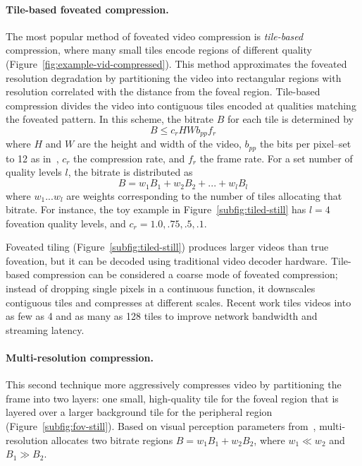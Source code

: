 \paragraph{Tile-based foveated compression.}
The most popular method of foveated video compression is \emph{tile-based} compression, where many small tiles encode regions of different quality (Figure~\ref{fig:example-vid-compressed}).
This method approximates the foveated resolution degradation by partitioning the video into rectangular regions with resolution correlated with the distance from the foveal region.
Tile-based compression divides the video into contiguous tiles encoded at qualities matching the foveated pattern.
In this scheme, the bitrate $B$ for each tile is determined by
\begin{equation}
    B \leq c_{r}HWb_{pp}f_{r}
\end{equation}
where $H$ and $W$ are the height and width of the video, $b_{pp}$ the bits per pixel--set to 12 as in~\cite{kaplanyan2019deepfovea}, $c_r$ the compression rate, and $f_r$ the frame rate.
For a set number of quality levels $l$, the bitrate is distributed as
\begin{equation}B = w_{1}B_{1} + w_{2}B_{2} + ... + w_{l}B_{l}
\end{equation}
where $w_{1} ... w_{l}$ are weights corresponding to the number of tiles allocating that bitrate.
For instance, the toy example in Figure~\ref{subfig:tiled-still} has $l=4$ foveation quality levels, and $c_r = {1.0, .75, .5, .1}$.

Foveated tiling (Figure~\ref{subfig:tiled-still}) produces larger videos than true foveation, but it can be decoded using traditional video decoder hardware.
Tile-based compression can be considered a coarse mode of foveated compression; instead of dropping single pixels in a continuous function, it downscales contiguous tiles and compresses at different scales.
Recent work tiles videos into as few as 4 and as many as 128 tiles to improve network bandwidth and streaming latency.

\paragraph{Multi-resolution compression.} This second technique more aggressively compresses video by partitioning the frame into two layers: one small, high-quality tile for the foveal region that is layered over a larger background tile for the peripheral region~\cite{guenter2012foveated}  (Figure~\ref{subfig:fov-still}).
Based on visual perception parameters from~\cite{guenter2012foveated}, multi-resolution allocates two bitrate regions $B = w_{1}B_{1} + w_{2}B_{2}$, where $w_{1} \ll w_{2}$ and $B_{1} \gg B_{2}$.

